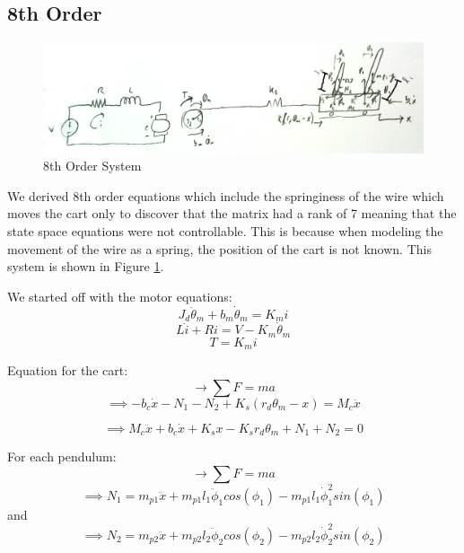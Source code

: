 \documentclass{article}
\begin{document}
\subsection{8th Order}
\begin{figure}[!htb]
\centering
\includegraphics[width=0.95\linewidth]{System8thOrder}
\caption{8th Order System}
\label{fig:8thOrder}
\end{figure}

We derived 8th order equations which include the springiness of the wire which moves the cart only to discover that the matrix had a rank of 7 meaning that the state space equations were not controllable. This is because when modeling the movement of the wire as a spring, the position of the cart is not known. This system is shown in Figure \ref{fig:8thOrder}.

We started off with the motor equations:
\begin{equation}
J_d \ddot{\theta}_m + b_m \dot{\theta}_m = K_m i
\label{eqn:8th1}
\end{equation}
\begin{equation}
L \dot{i} + R i = V - K_m \dot{\theta}_m
\label{eqn:8th2}
\end{equation}
\begin{equation}
T = K_m i
\label{eqn:8th3}
\end{equation}

Equation for the cart:
\begin{equation*}
\rightarrow \sum{F} = m a
\end{equation*}
\begin{equation*}
\implies -b_c \dot{x} - N_1 - N_2 + K_s (r_d \theta_m - x) = M_c \ddot{x}
\end{equation*}

\begin{equation}
\implies M_c \ddot{x} + b_c \dot{x} + K_s x - K_s r_d \theta_m + N_1 + N_2 = 0
\label{eqn:8th4}
\end{equation}

For each pendulum:
\begin{equation*}
\rightarrow \sum{F} = ma
\end{equation*}
\begin{equation}
\implies N_1 = m_{p1} \ddot{x} + m_{p1} l_1 \ddot{\phi}_1 cos(\phi_1) - m_{p1} l_1 \dot{\phi}_1^2 sin(\phi_1)
\label{eqn:8th5}
\end{equation}
and \begin{equation}
\implies N_2 = m_{p2} \ddot{x} + m_{p2} l_2 \ddot{\phi}_2 cos(\phi_2) - m_{p2} l_2 \dot{\phi}_2^2 sin(\phi_2)
\label{eqn:8th6}
\end{equation}
\end{document}

